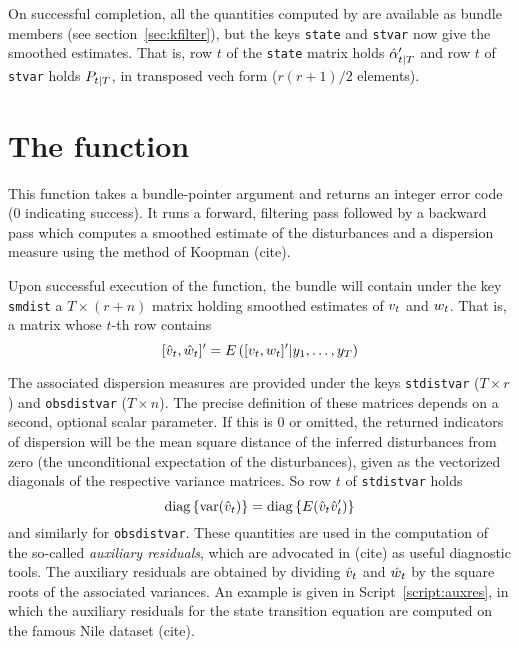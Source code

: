 \documentclass[a4paper]{article}
\begin{document}
On successful completion, all the quantities computed by
 are available as bundle members (see
section~\ref{sec:kfilter}), but the keys \texttt{state} and
\texttt{stvar} now give the smoothed estimates.  That is, row $t$ of
the \texttt{state} matrix holds $\hat{\alpha}_{t|T}'$ and row $t$
of \texttt{stvar} holds $P_{t|T}$, in transposed vech form
($r(r+1)/2$ elements).

\section{The  function}
\label{sec:kdsmooth}

This function takes a bundle-pointer argument and returns an integer
error code (0 indicating success).  It runs a forward, filtering pass
followed by a backward pass which computes a smoothed estimate of the
disturbances and a dispersion measure using the method of Koopman
(cite).

Upon successful execution of the function, the bundle will contain
under the key \texttt{smdist} a $T \times (r+n)$ matrix holding
smoothed estimates of $v_t$ and $w_t$. That is, a matrix
whose $t$-th row contains
\[
[\hat{v}_t , \hat{w}_t]' 
 = E\left( [v_t , w_t]' | y_1, \ldots, y_T \right)
\]

The associated dispersion measures are provided under the keys
\texttt{stdistvar} ($T \times r$) and \texttt{obsdistvar}
($T \times n$).  The precise definition of these matrices depends on a
second, optional scalar parameter. If this is 0 or omitted, the
returned indicators of dispersion will be the mean square distance of
the inferred disturbances from zero (the unconditional expectation of
the disturbances), given as the vectorized diagonals of the
respective variance matrices. So row $t$ of \texttt{stdistvar} holds
\[
\mbox{diag}\left\{\mbox{var}(\hat{v}_t)\right\} = 
\mbox{diag}\left\{E(\hat{v}_t\hat{v}_t')\right\}
\]
and similarly for \texttt{obsdistvar}.  These quantities are used in
the computation of the so-called \emph{auxiliary residuals}, which are
advocated in (cite) as useful diagnostic tools. The auxiliary
residuals are obtained by dividing $\hat{v}_t$ and
$\hat{w}_t$ by the square roots of the associated variances. An
example is given in Script~\ref{script:auxres}, in which the auxiliary
residuals for the state transition equation are computed on the
famous Nile dataset (cite).
\end{document}
